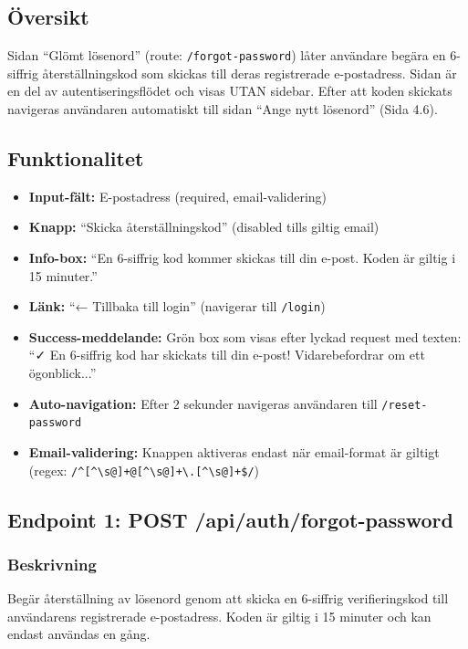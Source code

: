\documentclass[12pt,a4paper]{article}
\begin{document}
\subsection{Översikt}
Sidan ``Glömt lösenord'' (route: \texttt{/forgot-password}) låter användare begära en 6-siffrig återställningskod som skickas till deras registrerade e-postadress. Sidan är en del av autentiseringsflödet och visas UTAN sidebar. Efter att koden skickats navigeras användaren automatiskt till sidan ``Ange nytt lösenord'' (Sida 4.6).

\subsection{Funktionalitet}
\begin{itemize}[noitemsep]
  \item \textbf{Input-fält:} E-postadress (required, email-validering)
  \item \textbf{Knapp:} ``Skicka återställningskod'' (disabled tills giltig email)
  \item \textbf{Info-box:} ``En 6-siffrig kod kommer skickas till din e-post. Koden är giltig i 15 minuter.''
  \item \textbf{Länk:} ``← Tillbaka till login'' (navigerar till \texttt{/login})
  \item \textbf{Success-meddelande:} Grön box som visas efter lyckad request med texten: ``✓ En 6-siffrig kod har skickats till din e-post! Vidarebefordrar om ett ögonblick...''
  \item \textbf{Auto-navigation:} Efter 2 sekunder navigeras användaren till \texttt{/reset-password}
  \item \textbf{Email-validering:} Knappen aktiveras endast när email-format är giltigt (regex: \texttt{/\^{}[^\textbackslash{}s@]+@[^\textbackslash{}s@]+\textbackslash{}.[^\textbackslash{}s@]+\$/})
\end{itemize}

\subsection{Endpoint 1: POST /api/auth/forgot-password}

\subsubsection{Beskrivning}
Begär återställning av lösenord genom att skicka en 6-siffrig verifieringskod till användarens registrerade e-postadress. Koden är giltig i 15 minuter och kan endast användas en gång.
\end{document}
